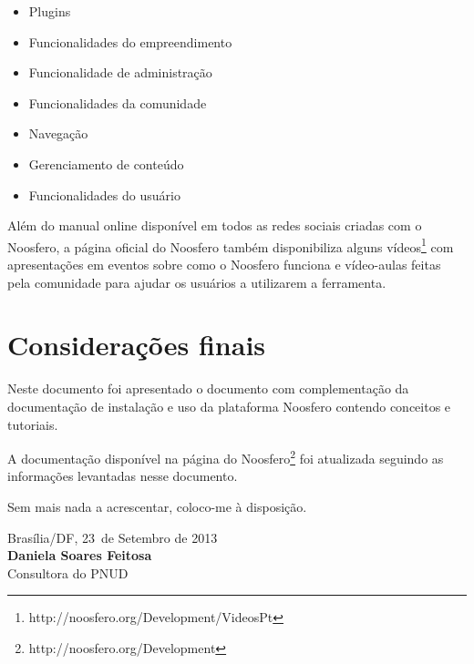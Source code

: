 \documentclass[[a4paper,11pt]{article}
\newcommand{\MyName}{Daniela Soares Feitosa}
\newcommand{\MesEntrega}{Setembro de 2013}
\newcommand{\DiaEntrega}{23}
\begin{document}
\begin{itemize}
  \item Plugins
  \item Funcionalidades do empreendimento
  \item Funcionalidade de administração
  \item Funcionalidades da comunidade
  \item Navegação
  \item Gerenciamento de conteúdo
  \item Funcionalidades do usuário
\end{itemize}

Além do manual online disponível em todos as redes sociais criadas com o
Noosfero, a página oficial do Noosfero também disponibiliza alguns
vídeos\footnote{http://noosfero.org/Development/VideosPt} com
apresentações em eventos sobre como o Noosfero funciona e vídeo-aulas
feitas pela comunidade para ajudar os usuários a utilizarem a
ferramenta.

\newpage

\section{Considerações finais}

Neste documento foi apresentado o documento com complementação da 
documentação de instalação e uso da plataforma Noosfero contendo
conceitos e tutoriais.

A documentação disponível na página do
Noosfero\footnote{http://noosfero.org/Development} foi atualizada
seguindo as informações levantadas nesse documento.

\vspace{1cm}

Sem mais nada a acrescentar, coloco-me à disposição.

\vspace{1cm}

\begin{minipage}{\textwidth}
  Brasília/DF, \DiaEntrega \ de \MesEntrega\\[1cm]
  \textbf{\MyName}\\
  \small Consultora do PNUD
\end{minipage}
\end{document}
